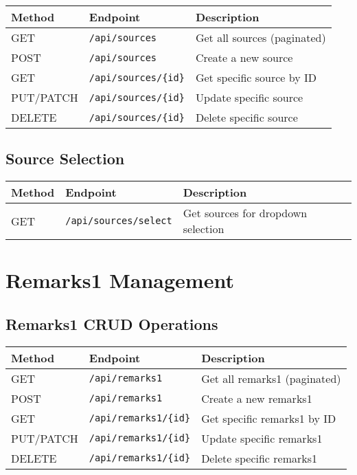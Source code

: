 \documentclass[12pt,a4paper]{article}
\begin{document}
\begin{longtable}{|p{}|p{}|p{}|}
\hline
\textbf{Method} & \textbf{Endpoint} & \textbf{Description} \\
\hline
\endhead

GET & \texttt{/api/sources} & Get all sources (paginated) \\
POST & \texttt{/api/sources} & Create a new source \\
GET & \texttt{/api/sources/\{id\}} & Get specific source by ID \\
PUT/PATCH & \texttt{/api/sources/\{id\}} & Update specific source \\
DELETE & \texttt{/api/sources/\{id\}} & Delete specific source \\
\hline
\end{longtable}

\subsection{Source Selection}

\begin{longtable}{|p{}|p{}|p{}|}
\hline
\textbf{Method} & \textbf{Endpoint} & \textbf{Description} \\
\hline
\endhead

GET & \texttt{/api/sources/select} & Get sources for dropdown selection \\
\hline
\end{longtable}

\section{Remarks1 Management}

\subsection{Remarks1 CRUD Operations}

\begin{longtable}{|p{}|p{}|p{}|}
\hline
\textbf{Method} & \textbf{Endpoint} & \textbf{Description} \\
\hline
\endhead

GET & \texttt{/api/remarks1} & Get all remarks1 (paginated) \\
POST & \texttt{/api/remarks1} & Create a new remarks1 \\
GET & \texttt{/api/remarks1/\{id\}} & Get specific remarks1 by ID \\
PUT/PATCH & \texttt{/api/remarks1/\{id\}} & Update specific remarks1 \\
DELETE & \texttt{/api/remarks1/\{id\}} & Delete specific remarks1 \\
\hline
\end{longtable}
\end{document}
